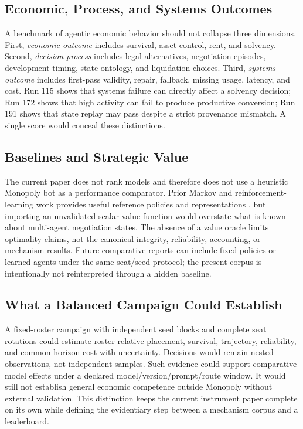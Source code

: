 \documentclass[conference]{IEEEtran}
\begin{document}
\subsection{Economic, Process, and Systems Outcomes}

A benchmark of agentic economic behavior should not collapse three dimensions. First, \emph{economic outcome} includes survival, asset control, rent, and solvency. Second, \emph{decision process} includes legal alternatives, negotiation episodes, development timing, state ontology, and liquidation choices. Third, \emph{systems outcome} includes first-pass validity, repair, fallback, missing usage, latency, and cost. Run 115 shows that systems failure can directly affect a solvency decision; Run 172 shows that high activity can fail to produce productive conversion; Run 191 shows that state replay may pass despite a strict provenance mismatch. A single score would conceal these distinctions.

\subsection{Baselines and Strategic Value}

The current paper does not rank models and therefore does not use a heuristic Monopoly bot as a performance comparator. Prior Markov and reinforcement-learning work provides useful reference policies and representations \cite{ash_bishop,bonjour_monopoly}, but importing an unvalidated scalar value function would overstate what is known about multi-agent negotiation states. The absence of a value oracle limits optimality claims, not the canonical integrity, reliability, accounting, or mechanism results. Future comparative reports can include fixed policies or learned agents under the same seat/seed protocol; the present corpus is intentionally not reinterpreted through a hidden baseline.

\subsection{What a Balanced Campaign Could Establish}

A fixed-roster campaign with independent seed blocks and complete seat rotations could estimate roster-relative placement, survival, trajectory, reliability, and common-horizon cost with uncertainty. Decisions would remain nested observations, not independent samples. Such evidence could support comparative model effects under a declared model/version/prompt/route window. It would still not establish general economic competence outside Monopoly without external validation. This distinction keeps the current instrument paper complete on its own while defining the evidentiary step between a mechanism corpus and a leaderboard.
\end{document}
